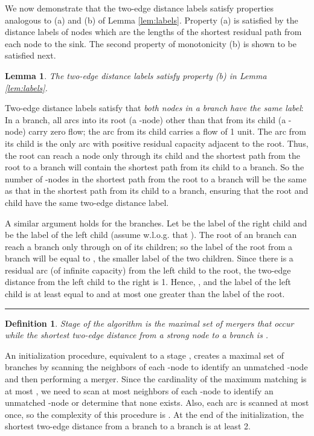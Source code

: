 \documentclass{article}
\newtheorem{lemma}{Lemma}[section]
\newtheorem{definition}{Definition}[section]
\newenvironment{proof}[1][Proof:]{\begin{trivlist}
\item[\hskip \labelsep {\bfseries #1}]}{\end{trivlist}}
\newcommand{\qed}{\hfill \rule{2.5mm}{2.5mm}}
\begin{document}
We now demonstrate that the two-edge distance labels satisfy properties analogous to (a) and (b) of Lemma \ref{lem:labels}. Property (a) is satisfied by the distance labels of nodes which are the lengths of the shortest residual path from each node to the sink.  The second property of monotonicity (b) is shown to be satisfied next.

\begin{lemma}
\label{lem:monotone}
The two-edge distance labels satisfy property (b) in Lemma \ref{lem:labels}.
\end{lemma}

\begin{proof}
Two-edge distance labels satisfy that {\em both nodes in a  branch have the same label}: In a  branch, all arcs into its root (a -node) other than that from its child (a -node) carry zero flow; the arc from its child carries a flow of 1 unit.  The arc from its child is the only arc with positive residual capacity adjacent to the root. Thus, the root can reach a  node only through its child and the shortest path from the root to a  branch will contain the shortest path from its child to a  branch.  So the number of -nodes in the shortest path from the root to a  branch will be the same as that in the shortest path from its child to a  branch, ensuring that the root and child have the same two-edge distance label.

A similar argument holds for the  branches. Let  be the label of the right child and  be the label of the left child (assume w.l.o.g. that ). The root of an  branch can reach a  branch only through on of its children; so the label of the root from a  branch will be equal to , the smaller label of the two children. Since there is a residual arc (of infinite capacity) from the left child to the root, the two-edge distance from the left child to the right is 1. Hence, , and the label of the left child is at least equal to and at most one greater than the label of the root. \qed
\end{proof}

\begin{definition}
{\em Stage } of the algorithm is the maximal set of mergers that occur while the shortest two-edge distance from a strong node to a  branch is .
\end{definition}

An initialization procedure, equivalent to a stage , creates a maximal set of  branches by scanning the neighbors of each -node to identify an unmatched -node and then performing a merger. Since the cardinality of the maximum matching is at most , we need to scan at most  neighbors of each -node to identify an unmatched -node or determine that none exists. Also, each arc is scanned at most once, so the complexity of this procedure is . At the end of the initialization, the shortest two-edge distance from a  branch to a  branch is at least 2.
\end{document}
